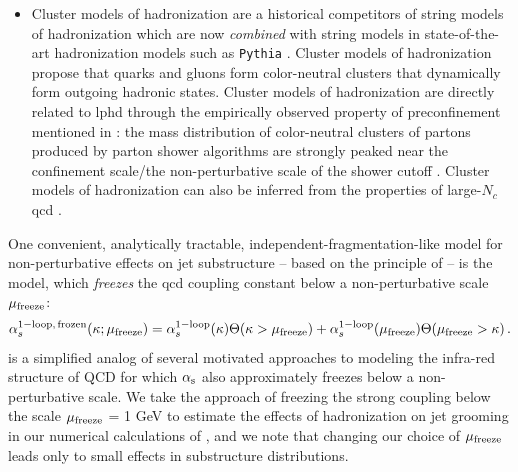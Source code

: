 \begin{subappendices}
\begin{itemize}
    \item

        Cluster models of hadronization are a historical competitors of string models of hadronization which are now \textit{combined} with string models in state-of-the-art hadronization models such as \texttt{Pythia} \cite{Bierlich:2022pfr}.
        Cluster models of hadronization propose that quarks and gluons form color-neutral clusters that dynamically form outgoing hadronic states.
        Cluster models of hadronization are directly related to \gls{lphd} through the empirically observed property of \gls{preconfinement} mentioned in :
        the mass distribution of color-neutral clusters of partons produced by parton shower algorithms are strongly peaked near the confinement scale/the non-perturbative scale of the shower cutoff \cite{Amati:1979fg,Bassetto:1979vy,Bertolini:1982em,Odagiri:2003ni}.
        Cluster models of hadronization can also be inferred from the properties of large-\(N_c\) \gls{qcd} \cite{Hoche:2014rga}.
\end{itemize}

One convenient, analytically tractable, independent-fragmentation-like model for non-perturbative effects on jet substructure -- based on the principle of  -- is the  model, which \textit{freezes} the \gls{qcd} coupling constant below a non-perturbative scale \(\mu_{\rm freeze}\):
\begin{align}
    \alpha^{\rm 1-loop,\,frozen}_s(\kappa; \mu_{\rm freeze})
    =
    \alpha^{\rm 1-loop}_s(\kappa)
    \Theta(\kappa > \mu_{\rm freeze})
    +
    \alpha^{\rm 1-loop}_s(\mu_{\rm freeze})
    \Theta(\mu_{\rm freeze} > \kappa)
    \,.
    \label{eq:frozen-coupling}
\end{align}
%
 is a simplified analog of several motivated approaches to modeling the infra-red structure of QCD for which \(\alpha_{\mathrm{s}}\) also approximately freezes below a non-perturbative scale.
%
We take the approach of freezing the strong coupling below the scale \(\mu_{\rm freeze}\) = 1 GeV to estimate the effects of hadronization on jet grooming in our numerical calculations of , and we note that changing our choice of \(\mu_{\rm freeze}\) leads only to small effects in substructure distributions.



\end{subappendices}

